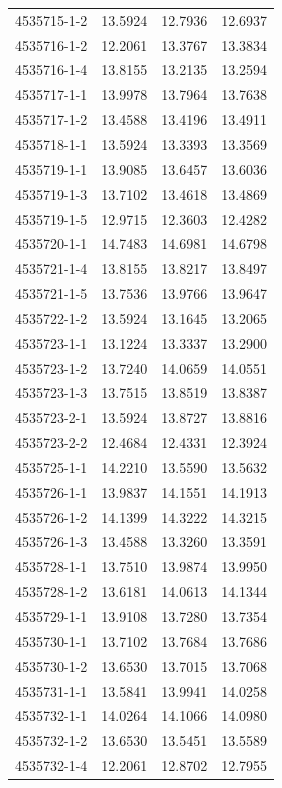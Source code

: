 \begin{longtable}{lrrr}
4535715-1-2 & 13.5924 & 12.7936 & 12.6937 \\
4535716-1-2 & 12.2061 & 13.3767 & 13.3834 \\
4535716-1-4 & 13.8155 & 13.2135 & 13.2594 \\
4535717-1-1 & 13.9978 & 13.7964 & 13.7638 \\
4535717-1-2 & 13.4588 & 13.4196 & 13.4911 \\
4535718-1-1 & 13.5924 & 13.3393 & 13.3569 \\
4535719-1-1 & 13.9085 & 13.6457 & 13.6036 \\
4535719-1-3 & 13.7102 & 13.4618 & 13.4869 \\
4535719-1-5 & 12.9715 & 12.3603 & 12.4282 \\
4535720-1-1 & 14.7483 & 14.6981 & 14.6798 \\
4535721-1-4 & 13.8155 & 13.8217 & 13.8497 \\
4535721-1-5 & 13.7536 & 13.9766 & 13.9647 \\
4535722-1-2 & 13.5924 & 13.1645 & 13.2065 \\
4535723-1-1 & 13.1224 & 13.3337 & 13.2900 \\
4535723-1-2 & 13.7240 & 14.0659 & 14.0551 \\
4535723-1-3 & 13.7515 & 13.8519 & 13.8387 \\
4535723-2-1 & 13.5924 & 13.8727 & 13.8816 \\
4535723-2-2 & 12.4684 & 12.4331 & 12.3924 \\
4535725-1-1 & 14.2210 & 13.5590 & 13.5632 \\
4535726-1-1 & 13.9837 & 14.1551 & 14.1913 \\
4535726-1-2 & 14.1399 & 14.3222 & 14.3215 \\
4535726-1-3 & 13.4588 & 13.3260 & 13.3591 \\
4535728-1-1 & 13.7510 & 13.9874 & 13.9950 \\
4535728-1-2 & 13.6181 & 14.0613 & 14.1344 \\
4535729-1-1 & 13.9108 & 13.7280 & 13.7354 \\
4535730-1-1 & 13.7102 & 13.7684 & 13.7686 \\
4535730-1-2 & 13.6530 & 13.7015 & 13.7068 \\
4535731-1-1 & 13.5841 & 13.9941 & 14.0258 \\
4535732-1-1 & 14.0264 & 14.1066 & 14.0980 \\
4535732-1-2 & 13.6530 & 13.5451 & 13.5589 \\
4535732-1-4 & 12.2061 & 12.8702 & 12.7955 \\

\end{longtable}
